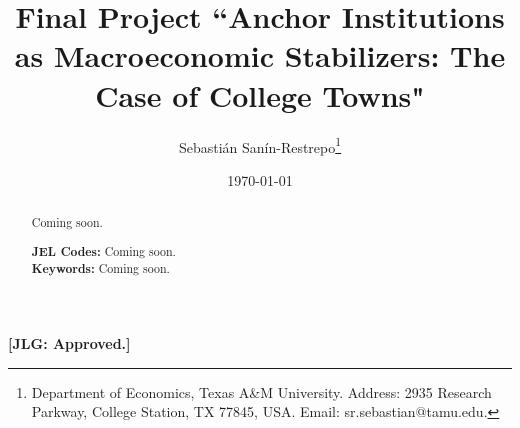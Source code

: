 


\title{\Large \textbf{Final Project ``Anchor Institutions as Macroeconomic Stabilizers: The Case of College Towns"}}

\author{Sebasti\'an San\'in-Restrepo\thanks{Department of Economics, Texas A\&M University. Address: 2935 Research Parkway, College Station, TX 77845, USA. Email: sr.sebastian@tamu.edu.}} 
\date{\today}

\maketitle
\thispagestyle{empty} 
\doublespacing
\thispagestyle{empty} 

\vspace{-10mm}
\renewcommand{\abstractname}{Abstract}
\begin{abstract} 
	\normalsize 
	\vspace{-5mm}
	
	\noindent Coming soon.\\ 
	\vspace{-5mm}
	
	\onehalfspacing
	\noindent \textbf{JEL Codes:} Coming soon.\\
	\noindent \textbf{Keywords:} Coming soon.
\end{abstract}

\pagebreak
{}

\doublespacing



\noindent \textbf{ [JLG: Approved.]}















\newpage
\singlespacing



\pagebreak
\renewcommand*{\thepage}{A.\arabic{page}}
\setcounter{page}{0}
\setcounter{equation}{0}
\renewcommand{\theequation}{A.\arabic{equation}}
\setcounter{section}{0}
\renewcommand{\thesection}{A.\arabic{section}}
\renewcommand{\thefigure}{A.\arabic{figure}}
\setcounter{figure}{0}
\renewcommand{\thetable}{A.\arabic{table}}
\setcounter{table}{0}
\thispagestyle{empty}


